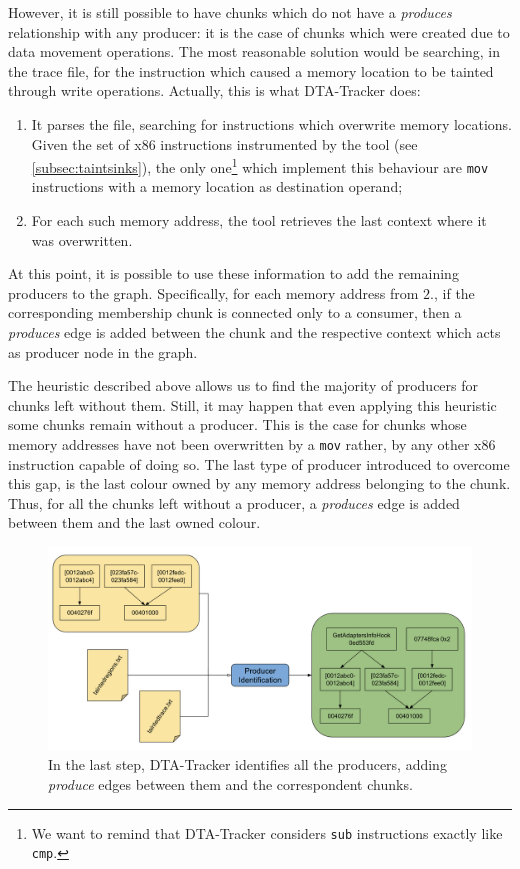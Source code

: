 \documentclass[LaM,binding=0.6cm]{sapthesis}
\begin{document}
However, it is still possible to have chunks which do not have a \textit{produces} relationship with any producer: it is the case of chunks which were created due to data movement operations. The most reasonable solution would be searching, in the trace file, for the instruction which caused a memory location to be tainted through write operations. Actually, this is what {\sf DTA-Tracker} does:
\begin{enumerate}
\item It parses the file, searching for instructions which overwrite memory locations. Given the set of x$86$ instructions instrumented by the tool (see \autoref{subsec:taintsinks}), the only one\footnote{We want to remind that {\sf DTA-Tracker} considers \texttt{sub} instructions exactly like \texttt{cmp}.} which implement this behaviour are \texttt{mov} instructions with a memory location as destination operand;
\item For each such memory address, the tool retrieves the last context where it was overwritten. 
\end{enumerate}
At this point, it is possible to use these information to add the remaining producers to the graph. Specifically, for each memory address from $2.$, if the corresponding membership chunk is connected only to a consumer, then a \textit{produces} edge is added between the chunk and the respective context which acts as producer node in the graph.

The heuristic described above allows us to find the majority of producers for chunks left without them. Still, it may happen that even applying this heuristic some chunks remain without a producer. This is the case for chunks whose memory addresses have not been overwritten by a \texttt{mov} rather, by any other x$86$ instruction capable of doing so. The last type of producer introduced to overcome this gap, is the last colour owned by any memory address belonging to the chunk. Thus, for all the chunks left without a producer, a \textit{produces} edge is added between them and the last owned colour.

\begin{figure}[h!]
\centering
\includegraphics[scale=.425]{images/dtatracker6}
\caption{In the last step, {\sf DTA-Tracker} identifies all the producers, adding \textit{produce} edges between them and the correspondent chunks.}
\end{figure}
\end{document}
